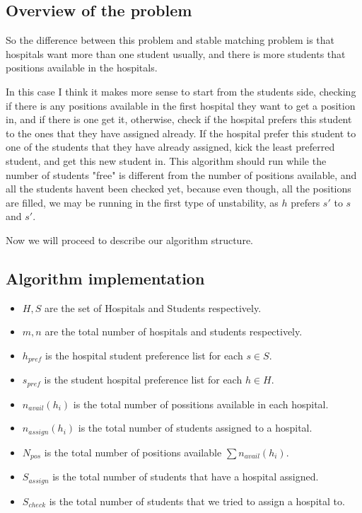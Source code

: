 \documentclass{article}
\begin{document}
\subsection*{Overview of the problem}

So the difference between this problem and stable matching problem is that hospitals want more than one student usually, and there is more students that positions available in the hospitals.

In this case I think it makes more sense to start from the students side, checking if there is any positions available in the first hospital they want to get a position in, and if there is one get it, otherwise, check if the hospital prefers this student to the ones that they have assigned already. If the hospital prefer this student to one of the students that they have already assigned, kick the least preferred student, and get this new student in. This algorithm should run while the number of students "free" is different from the number of positions available, and all the students havent been checked yet, because even though, all the positions are filled, we may be running in the first type of unstability, as $h$ prefers $s'$ to $s$ and $s'$.

Now we will proceed to describe our algorithm structure.

\subsection*{Algorithm implementation}

\begin{itemize}

\item $H,S$ are the set of Hospitals and Students respectively.

\item $m,n$ are the total number of hospitals and students respectively.

\item $h_{pref}$ is the hospital student preference list for each $s \in S$.
\item $s_{pref}$ is the student hospital preference list for each $h \in H$.

\item $n_{avail} (h_i)$ is the total number of possitions available in each hospital.
\item $n_{assign} (h_i)$ is the total number of students assigned to a hospital.

\item $N_{pos}$ is the total number of positions available $\sum n_{avail} (h_i)$.
\item $S_{assign}$ is the total number of students that have a hospital assigned.

\item $S_{check}$ is the total number of students that we tried to assign a hospital to.
\end{itemize}
  
\end{document}
